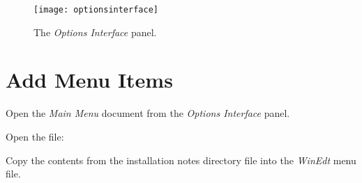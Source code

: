 \documentclass{lebook}
\begin{document}
\begin{figure}
	\centering
	\texttt{[image: optionsinterface]}
	\caption{The \textit{Options Interface} panel.}
	\label{fig:optionsinterface}
\end{figure}


\section{Add Menu Items}

\begin{numberedlist}
	\item Open the \textit{Main Menu} document from the \textit{Options Interface} panel.
       \item Open the file: 
       \item Copy the contents from the installation notes directory file into the \textit{WinEdt} menu file.
\end{numberedlist}
\end{document}
